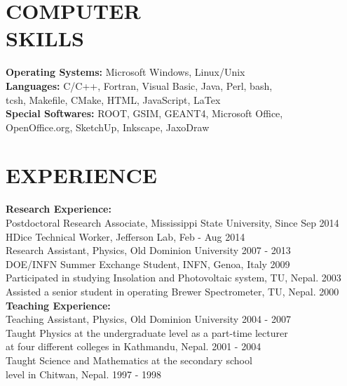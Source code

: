 \documentclass[line,margin]{res}
\begin{document}
\begin{resume}
 
\section{COMPUTER \\ SKILLS} %
                {\bf Operating Systems:} Microsoft Windows, Linux/Unix \\
                {\bf Languages:} C/C++, Fortran, Visual Basic, Java, Perl, bash, \\
                \hspace*{5 mm}tcsh, Makefile, CMake, HTML, JavaScript, LaTex \\ 
                {\bf Special Softwares:} ROOT, GSIM, GEANT4, Microsoft Office, \\
                \hspace*{5 mm} OpenOffice.org, SketchUp, Inkscape, JaxoDraw \\

\section{EXPERIENCE} 		{\bf Research Experience:} \\
		Postdoctoral Research Associate, Mississippi State University, \hfill Since Sep 2014\\
        HDice Technical Worker, Jefferson Lab, \hfill Feb - Aug 2014\\ %
		Research Assistant, Physics, Old Dominion University \hfill 2007 - 2013 \\
		DOE/INFN Summer Exchange Student, INFN, Genoa, Italy \hfill 2009 \\
		Participated in studying Insolation and Photovoltaic system, TU, Nepal. \hfill 2003 \\
		Assisted a senior student in operating Brewer Spectrometer, TU, Nepal. \hfill 2000 \\
		{\bf Teaching Experience:} \\
		Teaching Assistant, Physics, Old Dominion University \hfill 2004 - 2007 \\
		Taught Physics at the undergraduate level as a part-time lecturer \\
		\hspace*{3 mm} at four different colleges in Kathmandu, Nepal. \hfill 2001 - 2004 \\
		Taught Science and Mathematics at the secondary school \\
		\hspace*{3 mm} level in Chitwan, Nepal.  \hfill 1997 - 1998
		 


\end{resume}
\end{document}
